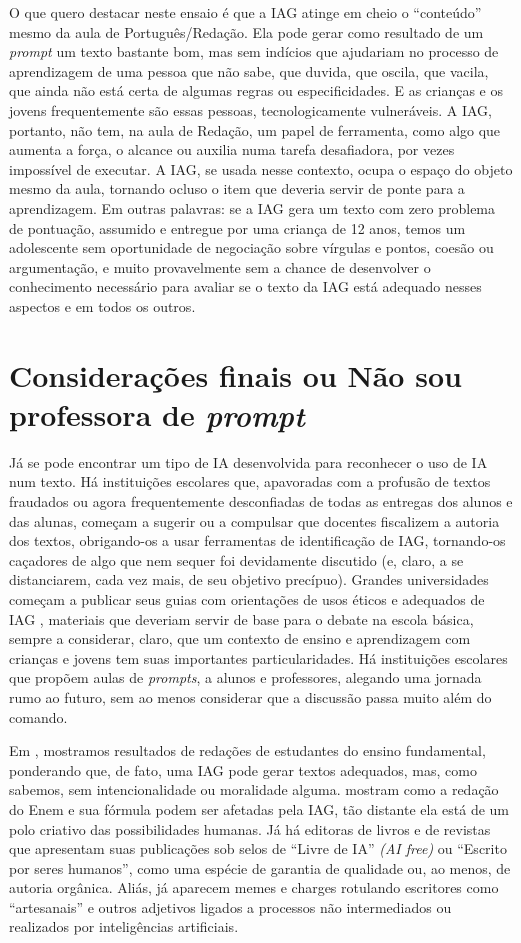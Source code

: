 \documentclass[portuguese]{textolivre}
\begin{document}
O que quero destacar neste ensaio é que a IAG atinge em cheio o ``conteúdo'' mesmo da aula de Português/Redação. Ela pode gerar como resultado de um \textit{prompt} um texto bastante bom, mas sem indícios que ajudariam no processo de aprendizagem de uma pessoa que não sabe, que duvida, que oscila, que vacila, que ainda não está certa de algumas regras ou especificidades. E as crianças e os jovens frequentemente são essas pessoas, tecnologicamente vulneráveis. A IAG, portanto, não tem, na aula de Redação, um papel de ferramenta, como algo que aumenta a força, o alcance ou auxilia numa tarefa desafiadora, por vezes impossível de executar. A IAG, se usada nesse contexto, ocupa o espaço do objeto mesmo da aula, tornando ocluso o item que deveria servir de ponte para a aprendizagem. Em outras palavras: se a IAG gera um texto com zero problema de pontuação, assumido e entregue por uma criança de 12 anos, temos um adolescente sem oportunidade de negociação sobre vírgulas e pontos, coesão ou argumentação, e muito provavelmente sem a chance de desenvolver o conhecimento necessário para avaliar se o texto da IAG está adequado nesses aspectos e em todos os outros.

\section{Considerações finais ou Não sou professora de \textit{prompt}}
Já se pode encontrar um tipo de IA desenvolvida para reconhecer o uso de IA num texto. Há instituições escolares que, apavoradas com a profusão de textos fraudados ou agora frequentemente desconfiadas de todas as entregas dos alunos e das alunas, começam a sugerir ou a compulsar que docentes fiscalizem a autoria dos textos, obrigando-os a usar ferramentas de identificação de IAG, tornando-os caçadores de algo que nem sequer foi devidamente discutido (e, claro, a se distanciarem, cada vez mais, de seu objetivo precípuo). Grandes universidades começam a publicar seus guias com orientações de usos éticos e adequados de IAG \cite{cnpq_integridade_2026}, materiais que deveriam servir de base para o debate na escola básica, sempre a considerar, claro, que um contexto de ensino e aprendizagem com crianças e jovens tem suas importantes particularidades. Há instituições escolares que propõem aulas de \textit{prompts}, a alunos e professores, alegando uma jornada rumo ao futuro, sem ao menos considerar que a discussão passa muito além do comando.

Em \textcite{dejesus2025}, mostramos resultados de redações de estudantes do ensino fundamental, ponderando que, de fato, uma IAG pode gerar textos adequados, mas, como sabemos, sem intencionalidade ou moralidade alguma. \textcite{buzato2024} mostram como a redação do Enem e sua fórmula podem ser afetadas pela IAG, tão distante ela está de um polo criativo das possibilidades humanas. Já há editoras de livros e de revistas que apresentam suas publicações sob selos de ``Livre de IA'' \textit{(AI free)} ou ``Escrito por seres humanos'', como uma espécie de garantia de qualidade ou, ao menos, de autoria orgânica. Aliás, já aparecem memes e charges rotulando escritores como ``artesanais'' e outros adjetivos ligados a processos não intermediados ou realizados por inteligências artificiais.
\end{document}
